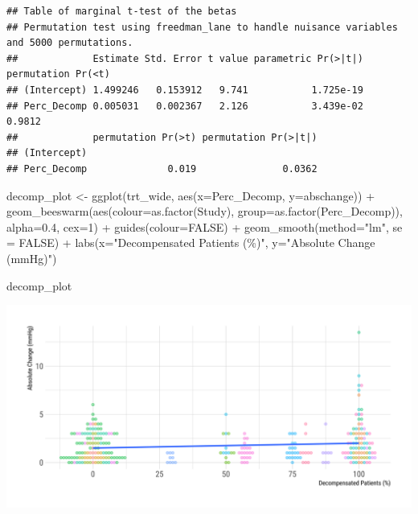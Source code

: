 \documentclass[
]{article}
\newenvironment{Shaded}{\begin{snugshade}}{\end{snugshade}}
\newcommand{\AttributeTok}[1]{\textcolor[rgb]{0.77,0.63,0.00}{#1}}
\newcommand{\ConstantTok}[1]{\textcolor[rgb]{0.00,0.00,0.00}{#1}}
\newcommand{\DecValTok}[1]{\textcolor[rgb]{0.00,0.00,0.81}{#1}}
\newcommand{\FloatTok}[1]{\textcolor[rgb]{0.00,0.00,0.81}{#1}}
\newcommand{\FunctionTok}[1]{\textcolor[rgb]{0.00,0.00,0.00}{#1}}
\newcommand{\NormalTok}[1]{#1}
\newcommand{\OtherTok}[1]{\textcolor[rgb]{0.56,0.35,0.01}{#1}}
\newcommand{\SpecialCharTok}[1]{\textcolor[rgb]{0.00,0.00,0.00}{#1}}
\newcommand{\StringTok}[1]{\textcolor[rgb]{0.31,0.60,0.02}{#1}}
\begin{document}
\begin{verbatim}
## Table of marginal t-test of the betas
## Permutation test using freedman_lane to handle nuisance variables and 5000 permutations.
##             Estimate Std. Error t value parametric Pr(>|t|) permutation Pr(<t)
## (Intercept) 1.499246   0.153912   9.741           1.725e-19                   
## Perc_Decomp 0.005031   0.002367   2.126           3.439e-02             0.9812
##             permutation Pr(>t) permutation Pr(>|t|)
## (Intercept)                                        
## Perc_Decomp              0.019               0.0362
\end{verbatim}

\begin{Shaded}
\begin{Highlighting}[]
\NormalTok{decomp\_plot }\OtherTok{\textless{}{-}} \FunctionTok{ggplot}\NormalTok{(trt\_wide, }\FunctionTok{aes}\NormalTok{(}\AttributeTok{x=}\NormalTok{Perc\_Decomp, }\AttributeTok{y=}\NormalTok{abschange)) }\SpecialCharTok{+}
  \FunctionTok{geom\_beeswarm}\NormalTok{(}\FunctionTok{aes}\NormalTok{(}\AttributeTok{colour=}\FunctionTok{as.factor}\NormalTok{(Study), }
                    \AttributeTok{group=}\FunctionTok{as.factor}\NormalTok{(Perc\_Decomp)),}
                \AttributeTok{alpha=}\FloatTok{0.4}\NormalTok{, }\AttributeTok{cex=}\DecValTok{1}\NormalTok{) }\SpecialCharTok{+}
  \FunctionTok{guides}\NormalTok{(}\AttributeTok{colour=}\ConstantTok{FALSE}\NormalTok{) }\SpecialCharTok{+} 
  \FunctionTok{geom\_smooth}\NormalTok{(}\AttributeTok{method=}\StringTok{"lm"}\NormalTok{, }\AttributeTok{se =} \ConstantTok{FALSE}\NormalTok{) }\SpecialCharTok{+}
  \FunctionTok{labs}\NormalTok{(}\AttributeTok{x=}\StringTok{"Decompensated Patients (\%)"}\NormalTok{,}
       \AttributeTok{y=}\StringTok{"Absolute Change (mmHg)"}\NormalTok{)}

\NormalTok{decomp\_plot}
\end{Highlighting}
\end{Shaded}

\includegraphics{figures/unnamed-chunk-34-1.png}
\end{document}
